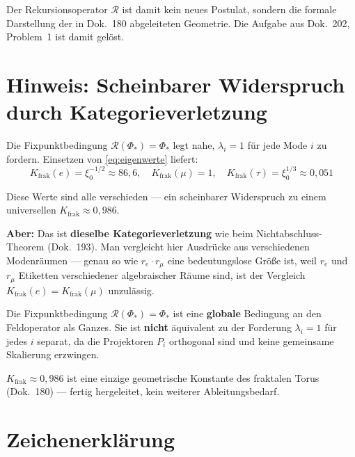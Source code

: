 Der Rekursionsoperator $\mathcal{R}$ ist damit kein neues Postulat,
sondern die formale Darstellung der in Dok.~180 abgeleiteten
Geometrie. Die Aufgabe aus Dok.~202, Problem~1 ist damit gelöst.

\section{Hinweis: Scheinbarer Widerspruch durch Kategorieverletzung}

Die Fixpunktbedingung $\mathcal{R}(\Phi_*) = \Phi_*$ legt nahe,
$\lambda_i = 1$ für jede Mode $i$ zu fordern. Einsetzen von
\eqref{eq:eigenwerte} liefert:
\[
  K_{\text{frak}}(e) = \xi_0^{-1/2} \approx 86{,}6, \quad
  K_{\text{frak}}(\mu) = 1, \quad
  K_{\text{frak}}(\tau) = \xi_0^{1/3} \approx 0{,}051
\]

Diese Werte sind alle verschieden — ein scheinbarer Widerspruch
zu einem universellen $K_{\text{frak}} \approx 0{,}986$.

\textbf{Aber:} Das ist \textbf{dieselbe Kategorieverletzung}
wie beim Nichtabschluss-Theorem (Dok.~193). Man vergleicht hier
Ausdrücke aus verschiedenen Modenräumen — genau so wie
$r_e \cdot r_\mu$ eine bedeutungslose Größe ist, weil $r_e$ und
$r_\mu$ Etiketten verschiedener algebraischer Räume sind,
ist der Vergleich $K_{\text{frak}}(e) = K_{\text{frak}}(\mu)$
unzulässig.

Die Fixpunktbedingung $\mathcal{R}(\Phi_*) = \Phi_*$ ist eine
\textbf{globale} Bedingung an den Feldoperator als Ganzes.
Sie ist \textbf{nicht} äquivalent zu der Forderung
$\lambda_i = 1$ für jedes $i$ separat, da die Projektoren
$P_i$ orthogonal sind und keine gemeinsame Skalierung erzwingen.

$K_{\text{frak}} \approx 0{,}986$ ist eine einzige geometrische
Konstante des fraktalen Torus (Dok.~180) --- fertig hergeleitet,
kein weiterer Ableitungsbedarf.


\section*{Zeichenerklärung}

